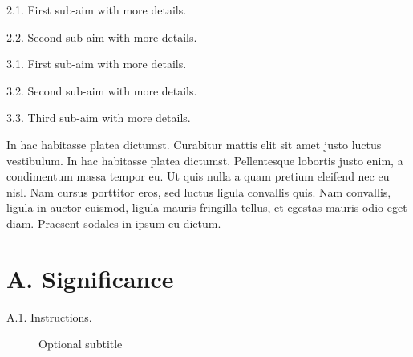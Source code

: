 \documentclass[11pt, notitlepage]{article} %
\begin{document}
\begin{description}
	\item[Aim 2: Really cool stuff.]{}
	\item{2.1. First sub-aim with more details.}
	\item{2.2. Second sub-aim with more details.}
\end{description}

\begin{description}
	\item[Aim 3: Really cool stuff.]{ }
	\item{3.1. First sub-aim with more details.}
	\item {3.2. Second sub-aim with more details.}
	\item{3.3. Third sub-aim with more details.}
\end{description}

In hac habitasse platea dictumst. Curabitur mattis elit sit amet justo luctus vestibulum. In hac habitasse platea dictumst. Pellentesque lobortis justo enim, a condimentum massa tempor eu. Ut quis nulla a quam pretium eleifend nec eu nisl. Nam cursus porttitor eros, sed luctus ligula convallis quis. Nam convallis, ligula in auctor euismod, ligula mauris fringilla tellus, et egestas mauris odio eget diam. Praesent sodales in ipsum eu dictum.


\newpage

\section*{A. Significance}

\begin{description} %
	\item[A.1. Instructions.]{Optional subtitle}
\end{description}
\end{document}
